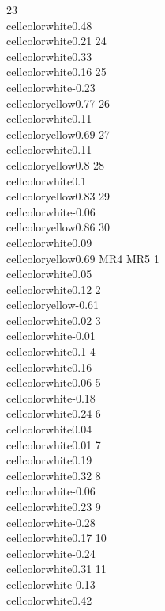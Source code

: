 \documentclass{article}\usepackage[]{graphicx}\usepackage[]{color}
\begin{document}
23  \\cellcolor{white}{0.48}  \\cellcolor{white}{0.21}
24  \\cellcolor{white}{0.33}  \\cellcolor{white}{0.16}
25 \\cellcolor{white}{-0.23} \\cellcolor{yellow}{0.77}
26  \\cellcolor{white}{0.11} \\cellcolor{yellow}{0.69}
27  \\cellcolor{white}{0.11}  \\cellcolor{yellow}{0.8}
28   \\cellcolor{white}{0.1} \\cellcolor{yellow}{0.83}
29 \\cellcolor{white}{-0.06} \\cellcolor{yellow}{0.86}
30  \\cellcolor{white}{0.09} \\cellcolor{yellow}{0.69}
                          MR4                       MR5
1    \\cellcolor{white}{0.05}  \\cellcolor{white}{0.12}
2  \\cellcolor{yellow}{-0.61}  \\cellcolor{white}{0.02}
3   \\cellcolor{white}{-0.01}   \\cellcolor{white}{0.1}
4    \\cellcolor{white}{0.16}  \\cellcolor{white}{0.06}
5   \\cellcolor{white}{-0.18}  \\cellcolor{white}{0.24}
6    \\cellcolor{white}{0.04}  \\cellcolor{white}{0.01}
7    \\cellcolor{white}{0.19}  \\cellcolor{white}{0.32}
8   \\cellcolor{white}{-0.06}  \\cellcolor{white}{0.23}
9   \\cellcolor{white}{-0.28}  \\cellcolor{white}{0.17}
10  \\cellcolor{white}{-0.24}  \\cellcolor{white}{0.31}
11  \\cellcolor{white}{-0.13}  \\cellcolor{white}{0.42}
\end{document}

